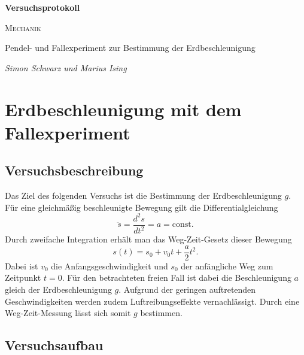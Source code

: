\documentclass[a4paper, 12pt]{scrartcl}
\begin{document}
\begin{titlepage}
	\centering
	{\Huge\bfseries Versuchsprotokoll\par}
	\vspace{2cm}
	{\scshape\LARGE Mechanik \par}
	\vspace{1cm}
	{\Large Pendel- und Fallexperiment zur Bestimmung der Erdbeschleunigung\par}
	\vfill
	{\large\itshape Simon Schwarz und Marius Ising\par}

	\vfill
\end{titlepage}

\tableofcontents
\newpage

\section{Erdbeschleunigung mit dem Fallexperiment}


\subsection{Versuchsbeschreibung}

Das Ziel des folgenden Versuchs ist die Bestimmung der Erdbeschleunigung $g$. Für eine gleichmäßig beschleunigte Bewegung gilt die Differentialgleichung
$$\ddot s = \frac{d^2s}{dt^2} = a = \mathrm{const}.$$
Durch zweifache Integration erhält man das Weg-Zeit-Gesetz dieser Bewegung
$$s(t) = s_0 + v_0t + \frac a2 t^2.$$
Dabei ist $v_0$ die Anfangsgeschwindigkeit und $s_0$ der anfängliche Weg zum Zeitpunkt $t=0$. Für den betrachteten freien Fall ist dabei die Beschleunigung $a$ gleich der Erdbeschleunigung $g$. Aufgrund der geringen auftretenden Geschwindigkeiten werden zudem Luftreibungseffekte vernachlässigt. Durch eine Weg-Zeit-Messung lässt sich somit $g$ bestimmen.


\subsection{Versuchsaufbau}
\end{document}
